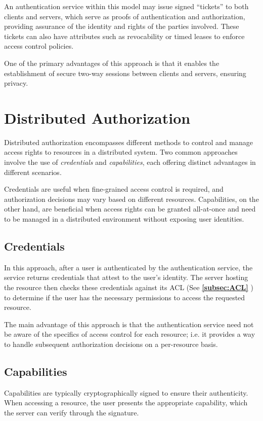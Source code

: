 \documentclass{report}
\newcommand{\asideBegin}[1]{\begin{tcolorbox}[colback=orange!5!white,colframe=black!75!orange,title={Aside:
      #1}]}
\newcommand{\asideEnd}{\end{tcolorbox}}
\newcommand{\refto}[2]{\textbf{\ref{#1:#2} \nameref{#1:#2}}}
\begin{document}
\asideBegin{Authentication Services}
An authentication service within this model may issue signed ``tickets'' to both clients and
servers, which serve as proofs of authentication and authorization, providing assurance of
the identity and rights of the parties involved. These tickets can also have attributes such as
revocability or timed leases to enforce access control policies. 
\asideEnd

One of the primary advantages of this approach is that it enables the establishment of secure two-way
sessions between clients and servers, ensuring privacy.





\section{Distributed Authorization}
Distributed authorization encompasses different methods to control and manage access rights to
resources in a distributed system. Two common approaches involve the use of \textit{credentials} and
\textit{capabilities}, each offering distinct advantages in different scenarios. 

Credentials are useful when fine-grained access control is required, and authorization decisions may
vary based on different resources. Capabilities, on the other hand, are beneficial when access
rights can be granted all-at-once and need to be managed in a distributed environment without
exposing user identities.

\subsection{Credentials}
In this approach, after a user is authenticated by the authentication service, the service returns
credentials that attest to the user's identity. The server hosting the resource then checks these
credentials against its ACL (See \refto{subsec}{ACL}) to determine if the user has the necessary
permissions to access the requested resource.

The main advantage of this approach is that the authentication service need not be aware of the
specifics of access control for each resource; i.e. it provides a way to handle subsequent
authorization decisions on a per-resource basis.


\subsection{Capabilities}
Capabilities are typically cryptographically signed to ensure their authenticity. When accessing a
resource, the user presents the appropriate capability, which the server can verify through the
signature.
\end{document}
